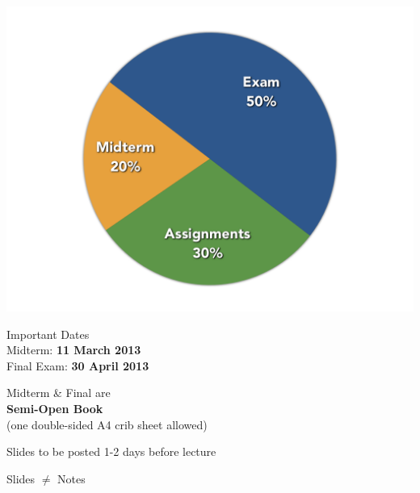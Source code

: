 \documentclass[20pt,handout,notes=show]{beamer}
\begin{document}
\begin{frame}
\begin{center}
	\includegraphics[scale=0.3]{figures/assessment-chart.png}
\end{center}
\end{frame}

\begin{frame}
\begin{center}
\large
Important Dates\\
Midterm: \textbf{11 March 2013}\\
Final Exam: \textbf{30 April 2013}
\end{center}
\end{frame}

\begin{frame}
\begin{center}
\large
Midterm \& Final are\\
\large
\textbf{Semi-Open Book}\\
\normalsize
(one double-sided A4 crib sheet allowed)
\end{center}
\end{frame}

\begin{frame}
\begin{center}
\large
Slides to be posted 1-2 days before lecture
\end{center}
\end{frame}

\begin{frame}
\begin{center}
\large
Slides $\not=$ Notes
\end{center}
\end{frame}
\end{document}
